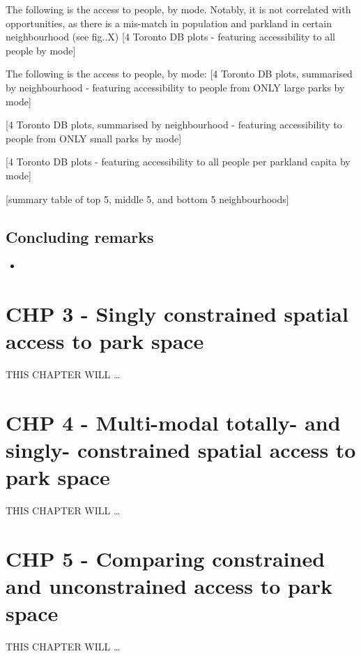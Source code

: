 \documentclass[
11pt, %
oneside, %
english, %
singlespacing, %
]{macthesis} %
\def\tightlist{}
\begin{document}
The following is the access to people, by mode. Notably, it is not correlated with opportunities, as there is a mis-match in population and parkland in certain neighbourhood (see fig..X)
{[}4 Toronto DB plots - featuring accessibility to all people by mode{]}

The following is the access to people, by mode:
{[}4 Toronto DB plots, summarised by neighbourhood - featuring accessibility to people from ONLY large parks by mode{]}

{[}4 Toronto DB plots, summarised by neighbourhood - featuring accessibility to people from ONLY small parks by mode{]}

{[}4 Toronto DB plots - featuring accessibility to all people per parkland capita by mode{]}

{[}summary table of top 5, middle 5, and bottom 5 neighbourhoods{]}

\section{Concluding remarks}\label{concluding-remarks}

\begin{itemize}
\tightlist
\item
\end{itemize}

\chapter{CHP 3 - Singly constrained spatial access to park space}\label{chp-3---singly-constrained-spatial-access-to-park-space}

THIS CHAPTER WILL \ldots{}

\chapter{CHP 4 - Multi-modal totally- and singly- constrained spatial access to park space}\label{chp-4---multi-modal-totally--and-singly--constrained-spatial-access-to-park-space}

THIS CHAPTER WILL \ldots{}

\chapter{CHP 5 - Comparing constrained and unconstrained access to park space}\label{chp-5---comparing-constrained-and-unconstrained-access-to-park-space}

THIS CHAPTER WILL \ldots{}
\end{document}
